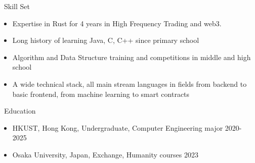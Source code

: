 \documentclass{resume}
\begin{document}

\begin{rSection}{\faCogs~Skill Set}
    \begin{itemize}
        \itemsep -0.5em
        \item Expertise in Rust for 4 years in High Frequency Trading and web3.
        \item Long history of learning Java, C, C++ since primary school 
        \item Algorithm and Data Structure training and competitions in middle and high school
        \item A wide technical stack, all main stream languages in fields from backend to basic frontend, from machine learning to smart contracts 
    \end{itemize}
    
\end{rSection}

\begin{rSection}{\faGraduationCap~Education}
    \begin{itemize}
        \item HKUST, Hong Kong, Undergraduate, Computer Engineering major \hfill 2020-2025
        \item Osaka University, Japan, Exchange, Humanity courses \hfill 2023 
    \end{itemize}
\end{rSection}
\end{document}
